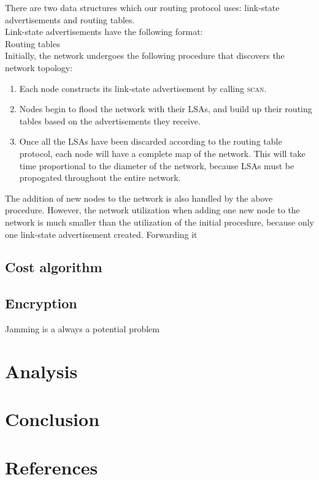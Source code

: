 \documentclass[letterpaper]{article}
\begin{document}
\noindent There are two data structures which our routing protocol uses: link-state advertisements and
routing tables. 
\\

\noindent Link-state advertisements have the following format:
\\

\noindent Routing tables
\\

\noindent Initially, the network undergoes the following procedure that discovers the network topology:

\begin{enumerate}
  \item Each node constructs its link-state advertisement by calling \textsc{scan}. 
  \item Nodes begin to flood the network with their LSAs, and build up their routing tables based on
  the advertisements they receive.
  \item Once all the LSAs have been discarded according to the routing table protocol, each node will have
  a complete map of the network. This will take time proportional to the diameter of the network, because
  LSAs must be propogated throughout the entire network.
\end{enumerate}

\noindent The addition of new nodes to the network is also handled by the above procedure. However, the
network utilization when adding one new node to the network is much smaller than the utilization of the 
initial procedure, because only one link-state advertisement created. Forwarding it  

\subsection{Cost algorithm}

\subsection{Encryption}

Jamming is a always a potential problem

\section{Analysis}

\section{Conclusion}

\section{References}
\end{document}
